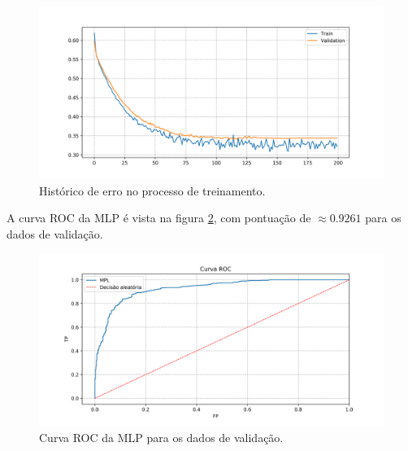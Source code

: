 \documentclass{article}
\begin{document}
    \begin{figure}[H]
        \centering
        \includegraphics[width=\linewidth]{mlp_training.png}   
        \caption{Histórico de erro no processo de treinamento.}
        \label{fig:mlp_training}
    \end{figure}
   
    A curva ROC da MLP é vista na figura \ref{fig:mlp_roc}, com pontuação de $\approx0.9261$ para os dados de validação.
    \begin{figure}[H]
        \centering
        \includegraphics[width=\linewidth]{mlp_roc.png}   
        \caption{Curva ROC da MLP para os dados de validação.}
        \label{fig:mlp_roc}
    \end{figure}
\end{document}
